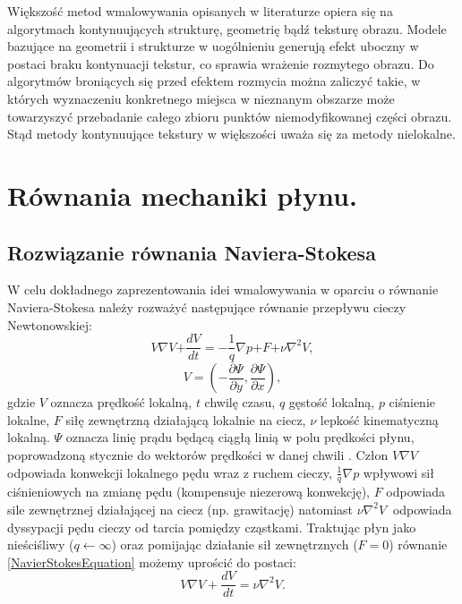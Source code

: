 \documentclass[12pt, twoside, openany]{report}
\theoremstyle{definition}
\begin{document}
Większość metod wmalowywania opisanych w literaturze opiera się na algorytmach kontynuujących strukturę, geometrię bądź teksturę obrazu. Modele bazujące na geometrii i strukturze w uogólnieniu generują efekt uboczny w postaci braku kontynuacji tekstur, co sprawia wrażenie rozmytego obrazu. Do algorytmów broniących się przed efektem rozmycia można zaliczyć takie, w których wyznaczeniu konkretnego miejsca w nieznanym obszarze może towarzyszyć przebadanie całego zbioru punktów niemodyfikowanej części obrazu. Stąd metody kontynuujące tekstury w większości uważa się za metody nielokalne.
\chapter{Równania mechaniki płynu.}
\label{chap:navierstokes}
\section{Rozwiązanie równania Naviera-Stokesa }
\label{sec:snavierstokes}
W celu dokładnego zaprezentowania idei wmalowywania w oparciu o równanie Naviera-Stokesa należy rozważyć następujące równanie przepływu cieczy Newtonowskiej:
\begin{equation}
V \nabla V \mathrm{+} \frac{dV}{dt} = - \frac{\mathrm{1}}{q}\nabla p\mathrm{+}F \mathrm{+}\nu {\nabla }^{\mathrm{2}} V
\label{NavierStokesEquation}
,
\end{equation}
\begin{equation}
V = \left( -\frac{\partial\Psi}{\partial y},\frac{\partial \Psi}{\partial x} \right)
\label{LiquidVelociy}
,
\end{equation}
gdzie $V$ oznacza prędkość lokalną, $t$ chwilę czasu, $q$ gęstość lokalną, $p$ ciśnienie lokalne, $F$ siłę zewnętrzną działającą lokalnie na ciecz, $\nu$ lepkość kinematyczną lokalną. $\mathit{\Psi}$ oznacza linię prądu będącą ciągłą linią w polu prędkości płynu, poprowadzoną
stycznie do wektorów prędkości w danej chwili \cite{BertalmioNavierStokes}. Człon $V\nabla V$ odpowiada konwekcji lokalnego pędu wraz z ruchem cieczy, $\frac{1}{q}\nabla p$ wpływowi sił ciśnieniowych na zmianę pędu (kompensuje niezerową konwekcję),  $F$ odpowiada sile zewnętrznej działającej na ciecz (np. grawitację) natomiast $\nu {\nabla }^2V\ $ odpowiada dyssypacji pędu cieczy od tarcia pomiędzy cząstkami. Traktując płyn jako nieściśliwy ($q \leftarrow \infty $)  oraz pomijając działanie sił zewnętrznych ($F=0$)  równanie \eqref{NavierStokesEquation} możemy uprościć do postaci:
\begin{equation}
 V\nabla V+\frac{dV}{dt}=\nu {\nabla }^2V
\label{NavierStokesEquationShort}
.
\end{equation}
\end{document}
